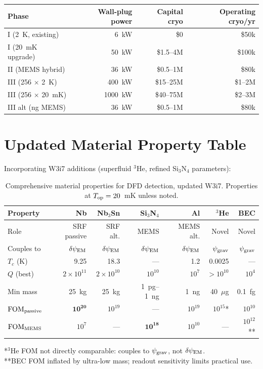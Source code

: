 \documentclass[11pt]{article}
\theoremstyle{definition}
\theoremstyle{remark}
\newcommand{\ee}[1]{\times 10^{#1}}
\newcommand{\psigrav}{\psi_{\rm grav}}
\newcommand{\psiEM}{\delta\psi_{\rm EM}}
\newcommand{\FOMpassive}{\mathrm{FOM}_{\rm passive}}
\newcommand{\FOMMEMS}{\mathrm{FOM}_{\rm MEMS}}
\begin{document}
\begin{center}
\renewcommand{\arraystretch}{1.3}
\begin{tabular}{lrrr}
\toprule
Phase & Wall-plug power & Capital cryo & Operating cryo/yr \\
\midrule
I (2~K, existing) & 6~kW & \$0 & \$50k \\
I (20~mK upgrade) & 50~kW & \$1.5--4M & \$100k \\
II (MEMS hybrid) & 36~kW & \$0.5--1M & \$80k \\
III (256 $\times$ 2~K) & 400~kW & \$15--25M & \$1--2M \\
III (256 $\times$ 20~mK) & 1000~kW & \$40--75M & \$2--3M \\
III alt (ng MEMS) & 36~kW & \$0.5--1M & \$80k \\
\bottomrule
\end{tabular}
\end{center}


\section{Updated Material Property Table}
\label{sec:property_table}

Incorporating W3i7 additions (superfluid $^3$He, refined Si$_3$N$_4$
parameters):

\begin{table}[H]
\centering
\caption{Comprehensive material properties for DFD detection, updated W3i7.
Properties at $T_{\rm op} = 20$~mK unless noted.}
\label{tab:properties_w3i7}
\renewcommand{\arraystretch}{1.2}
\begin{tabular}{p{2.2cm}rrrrrr}
\toprule
Property & Nb & Nb$_3$Sn & Si$_3$N$_4$ & Al & $^3$He & BEC \\
\midrule
Role & SRF passive & SRF alt. & MEMS & MEMS alt. & Novel & Novel \\
Couples to & $\psiEM$ & $\psiEM$ & $\psiEM$ & $\psiEM$ & $\psigrav$ & $\psigrav$ \\
$T_c$ (K) & 9.25 & 18.3 & --- & 1.2 & 0.0025 & --- \\
$Q$ (best) & $2\ee{11}$ & $2\ee{10}$ & $10^{10}$ & $10^7$ & $>10^{10}$ & $10^4$ \\
Min mass & 25~kg & 25~kg & 1~pg--1~ng & 1~ng & 40~$\mu$g & 0.1~fg \\
$\FOMpassive$ & $\mathbf{10^{20}}$ & $10^{19}$ & --- & $10^{19}$ & $10^{15}$* & $10^{10}$ \\
$\FOMMEMS$ & $10^{7}$ & --- & $\mathbf{10^{18}}$ & $10^{10}$ & --- & $10^{12}$** \\
\bottomrule
\end{tabular}

\smallskip
\small
*$^3$He FOM not directly comparable: couples to $\psigrav$, not $\psiEM$.\\
**BEC FOM inflated by ultra-low mass; readout sensitivity limits practical use.
\end{table}
\end{document}
